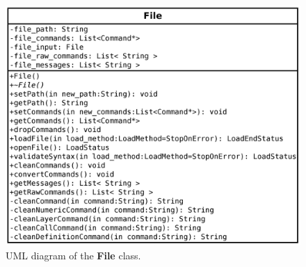 \documentclass[11pt,twoside,openany,x11names,svgnames]{memoir}
\begin{document}
\begin{figure}
	\centering
	\includegraphics[scale=0.18, clip=true, trim= 0pt 0pt 0pt 0pt]{images/chapter03-image34}
	\caption{UML diagram of the \textbf{File} class.}
	\label{fig:class-file}
\end{figure}
\end{document}
